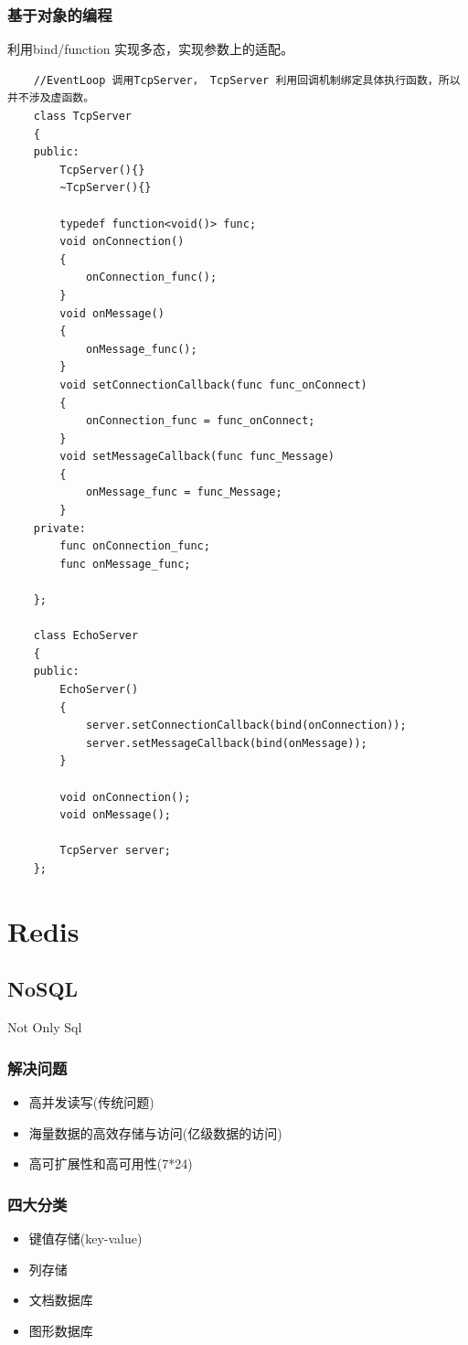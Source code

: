 \documentclass[UTF8,a4paper,8pt]{ctexbook}
\begin{document}
		\subsection{基于对象的编程}利用bind/function 实现多态，实现参数上的适配。
			\begin{lstlisting}
	//EventLoop 调用TcpServer， TcpServer 利用回调机制绑定具体执行函数，所以并不涉及虚函数。 		
	class TcpServer
	{
	public:
		TcpServer(){}
		~TcpServer(){}
		
		typedef function<void()> func;
		void onConnection()
		{
			onConnection_func();
		}
	    void onMessage()
	    {
		    onMessage_func();
	    }
	    void setConnectionCallback(func func_onConnect)
	    {
		    onConnection_func = func_onConnect;
	    }
	    void setMessageCallback(func func_Message)
	    {
		    onMessage_func = func_Message;
	    }
    private:
	    func onConnection_func;
	    func onMessage_func;
	    
	};
				
	class EchoServer
	{
	public:
		EchoServer()
		{
			server.setConnectionCallback(bind(onConnection));
			server.setMessageCallback(bind(onMessage));
		}
		
		void onConnection();
		void onMessage();
		
		TcpServer server;
	};
			\end{lstlisting}

\chapter{Redis}
	\section{NoSQL} Not Only Sql
		\subsection{解决问题}
			\begin{itemize}
				\item 高并发读写(传统问题)
				\item 海量数据的高效存储与访问(亿级数据的访问)
				\item 高可扩展性和高可用性(7*24)
			\end{itemize}
		
		\subsection{四大分类}
			\begin{itemize}
				\item 键值存储(key-value)
				\item 列存储
				\item 文档数据库
				\item 图形数据库
			\end{itemize}
	
\end{document}
